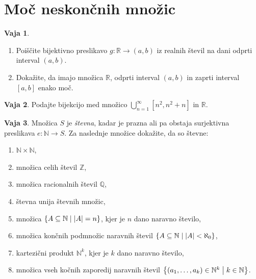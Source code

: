 \documentclass{article}
\newcommand{\NN}{\mathbb{N}}
\newcommand{\ZZ}{\mathbb{Z}}
\newcommand{\QQ}{\mathbb{Q}}
\newcommand{\RR}{\mathbb{R}}
\theoremstyle{definition}
\newtheorem{vaja}{Vaja}
\begin{document}









\section{Moč neskončnih množic}

\begin{vaja}
  \
  \begin{enumerate}
    \item
      Poiščite bijektivno preslikavo $g\colon \RR \to (a,b)$ iz realnih števil na dani odprti interval $(a,b)$.
    \item
      Dokažite, da imajo množica $\RR$, odprti interval $(a,b)$ in zaprti interval $[a,b]$ enako moč.
  \end{enumerate}
\end{vaja}

\begin{vaja}
  Podajte bijekcijo med množico $\bigcup_{n = 1}^{\infty} [n^2, n^2 + n]$ in $\mathbb{R}$.
\end{vaja}

\begin{vaja}
  Množica $S$ je \emph{števna}, kadar je prazna ali pa obstaja surjektivna preslikava $e\colon \NN \to S$. Za naslednje množice dokažite, da so števne:
  \begin{enumerate}
    \item
      $\NN \times \NN$,
    \item
      množica celih števil $\ZZ$,
    \item
      množica racionalnih števil $\QQ$,
    \item
      števna unija števnih množic,
    \item
      množica $\set{A \subseteq \NN}{|A| = n}$, kjer je $n$ dano naravno število,
    \item
      množica končnih podmnožic naravnih števil $\set{A \subseteq \NN}{|A| < \aleph_0}$,
    \item
      kartezični produkt $\NN^k$, kjer je $k$ dano naravno število,
    \item
      množica vseh kočnih zaporedij naravnih števil $\set{(a_1, \ldots, a_k) \in \NN^k}{k \in \NN}$.
  \end{enumerate}
\end{vaja}
\end{document}

